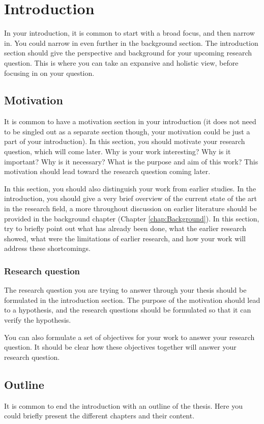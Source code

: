 \chapter{Introduction}
\label{chap:Introduction}

In your introduction, it is common to start with a broad focus, and then narrow in. You could narrow in even further in the background section. The introduction section should give the perspective and background for your upcoming research question. This is where you can take an expansive and holistic view, before focusing in on your question.

\section{Motivation}

It is common to have a motivation section in your introduction (it does not need to be singled out as a separate section though, your motivation could be just a part of your introduction). In this section, you should motivate your research question, which will come later. Why is your work interesting? Why is it important? Why is it necessary? What is the purpose and aim of this work? This motivation should lead toward the research question coming later.

In this section, you should also distinguish your work from earlier studies. In the introduction, you should give a very brief overview of the current state of the art in the research field, a more throughout discussion on earlier literature should be provided in the background chapter (Chapter \ref{chap:Background}). In this section, try to briefly point out what has already been done, what the earlier research showed, what were the limitations of earlier research, and how your work will address these shortcomings.


\subsection{Research question}

The research question you are trying to answer through your thesis should be formulated in the introduction section. The purpose of the motivation should lead to a hypothesis, and the research questions should be formulated so that it can verify the hypothesis.

You can also formulate a set of objectives for your work to answer your research question.  It should be clear how these objectives together will answer your research question.

\section{Outline}

It is common to end the introduction with an outline of the thesis. Here you could briefly present the different chapters and their content.